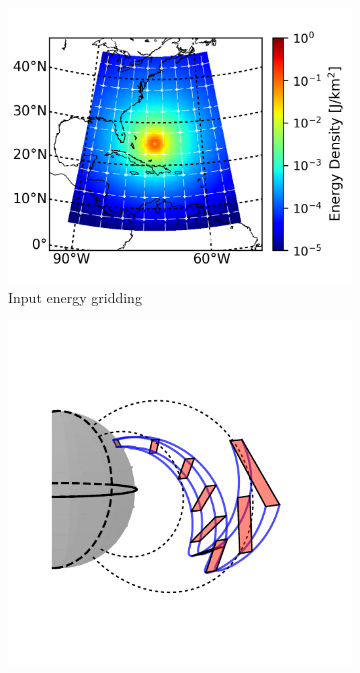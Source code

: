     \begin{figure}[h!]
    \centering
    \begin{subfigure}[t]{0.45\textwidth}
    \centering
        	\includegraphics[width=1.2\textwidth]{figures/input_energy_with_grid.png}
	\caption{Input energy gridding}
        \label{fig:input_energy_grid}
    \end{subfigure}\hfill
    \begin{subfigure}[t]{0.45\textwidth}
    \centering
        	\includegraphics[trim={1cm 1cm 1cm 1cm},clip]{figures/interpolation_globe1.pdf}

\end{subfigure}
\end{figure}

